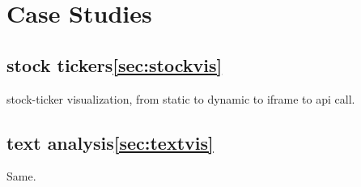 \section{Case Studies}

\subsection{stock tickers\ref{sec:stockvis}}

stock-ticker visualization, from static to dynamic to iframe to api
call.

\subsection{text analysis\ref{sec:textvis}}

Same.

%
